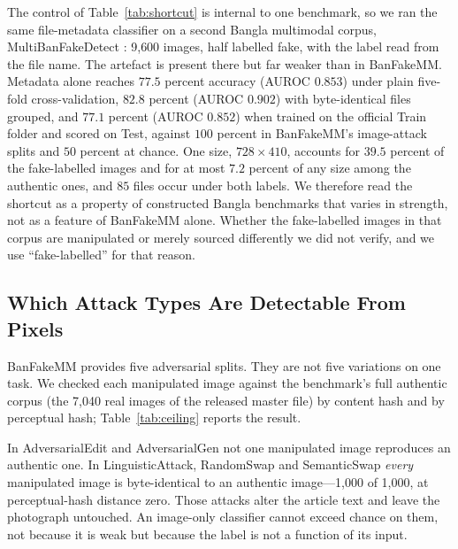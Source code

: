 \documentclass[pdflatex,sn-mathphys-num]{sn-jnl}
\begin{document}
The control of Table~\ref{tab:shortcut} is internal to one benchmark, so we ran
the same file-metadata classifier on a second Bangla multimodal corpus,
MultiBanFakeDetect \cite{multibanfake}: 9{,}600 images, half labelled fake,
with the label read from the file name. The artefact is present there but far
weaker than in BanFakeMM. Metadata alone reaches $77.5$ percent accuracy
(AUROC $0.853$) under plain five-fold cross-validation, $82.8$ percent
(AUROC $0.902$) with byte-identical files grouped, and $77.1$ percent
(AUROC $0.852$) when trained on the official Train folder and scored on Test,
against $100$ percent in BanFakeMM's image-attack splits and $50$ percent at
chance. One size, $728\times410$, accounts for $39.5$ percent of the
fake-labelled images and for at most $7.2$ percent of any size among the
authentic ones, and $85$ files occur under both labels. We therefore read the
shortcut as a property of constructed Bangla benchmarks that varies in
strength, not as a feature of BanFakeMM alone. Whether the fake-labelled images
in that corpus are manipulated or merely sourced differently we did not
verify, and we use ``fake-labelled'' for that reason.

\subsection{Which Attack Types Are Detectable From Pixels}
\label{sec:detectable}

BanFakeMM provides five adversarial splits. They are not five variations on
one task. We checked each manipulated image against the benchmark's full
authentic corpus (the 7{,}040 real images of the released master file) by
content hash and by perceptual hash; Table~\ref{tab:ceiling} reports the
result.

In AdversarialEdit and AdversarialGen not one manipulated image reproduces an
authentic one. In LinguisticAttack, RandomSwap and SemanticSwap \emph{every}
manipulated image is byte-identical to an authentic image---1{,}000 of 1{,}000,
at perceptual-hash distance zero. Those attacks alter the article text and
leave the photograph untouched. An image-only classifier cannot exceed chance
on them, not because it is weak but because the label is not a function of its
input.
\end{document}
